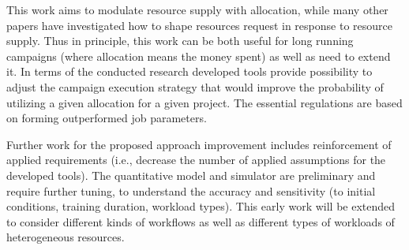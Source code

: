 This work aims to modulate resource supply with allocation, while many other
papers have investigated how to shape resources request in response to
resource supply. Thus in principle, this work can be both useful for long
running campaigns (where allocation means the money spent) as well as need
to extend it. In terms of the conducted research developed tools provide
possibility to adjust the campaign execution strategy that would improve the
probability of utilizing a given allocation for a given project. The
essential regulations are based on forming outperformed job parameters.

Further work for the proposed approach improvement includes reinforcement of
applied requirements (i.e., decrease the number of applied assumptions for
the developed tools). The quantitative model and simulator are preliminary
and require further tuning, to understand the accuracy and sensitivity (to
initial conditions, training duration, workload types). This early work will
be extended to consider different kinds of workflows as well as different
types of workloads of heterogeneous resources.
